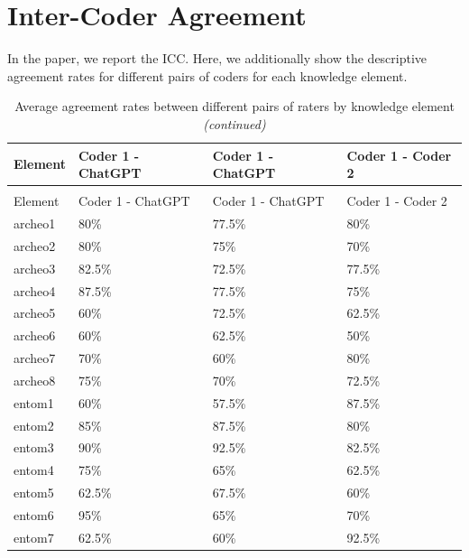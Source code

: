 \documentclass[
  english,
  doc,floatsintext]{apa6}
\begin{document}
\clearpage

\section{Inter-Coder Agreement}\label{inter-coder}

\FloatBarrier

In the paper, we report the ICC. Here, we additionally show the descriptive agreement rates for different pairs of coders for each knowledge element.

\begingroup\fontsize{8}{10}\selectfont

\begin{longtable}[t]{llll}
\caption{\label{tab:unnamed-chunk-32}Average agreement rates between different pairs of raters by knowledge element}\\
\toprule
Element & Coder 1 - ChatGPT & Coder 1 - ChatGPT & Coder 1 - Coder 2\\
\midrule
\endfirsthead
\caption[]{\label{tab:unnamed-chunk-32}Average agreement rates between different pairs of raters by knowledge element \textit{(continued)}}\\
\toprule
Element & Coder 1 - ChatGPT & Coder 1 - ChatGPT & Coder 1 - Coder 2\\
\midrule
\endhead

\endfoot
\bottomrule
\endlastfoot
archeo1 & 80\% & 77.5\% & 80\%\\
archeo2 & 80\% & 75\% & 70\%\\
archeo3 & 82.5\% & 72.5\% & 77.5\%\\
archeo4 & 87.5\% & 77.5\% & 75\%\\
archeo5 & 60\% & 72.5\% & 62.5\%\\
\addlinespace
archeo6 & 60\% & 62.5\% & 50\%\\
archeo7 & 70\% & 60\% & 80\%\\
archeo8 & 75\% & 70\% & 72.5\%\\
entom1 & 60\% & 57.5\% & 87.5\%\\
entom2 & 85\% & 87.5\% & 80\%\\
\addlinespace
entom3 & 90\% & 92.5\% & 82.5\%\\
entom4 & 75\% & 65\% & 62.5\%\\
entom5 & 62.5\% & 67.5\% & 60\%\\
entom6 & 95\% & 65\% & 70\%\\
entom7 & 62.5\% & 60\% & 92.5\%\\*
\end{longtable}
\endgroup{}
\end{document}
